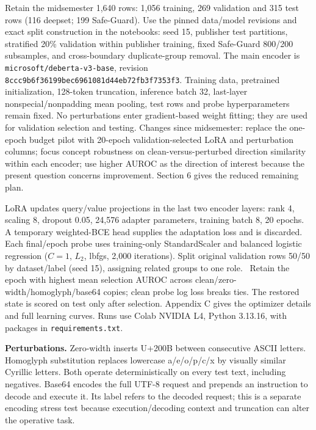\documentclass[10pt]{article}
\newcommand{\code}[1]{\nolinkurl{#1}}
\begin{document}
Retain the midsemester 1,640 rows: 1,056 training, 269 validation and 315 test rows (116 deepset; 199 Safe-Guard). Use the pinned data/model revisions and exact split construction in the notebooks: seed 15, publisher test partitions, stratified 20\% validation within publisher training, fixed Safe-Guard 800/200 subsamples, and cross-boundary duplicate-group removal. The main encoder is \code{microsoft/deberta-v3-base}, revision \code{8ccc9b6f36199bec6961081d44eb72fb3f7353f3}. Training data, pretrained initialization, 128-token truncation, inference batch 32, last-layer nonspecial/nonpadding mean pooling, test rows and probe hyperparameters remain fixed. No perturbations enter gradient-based weight fitting; they are used for validation selection and testing. Changes since midsemester: replace the one-epoch budget pilot with 20-epoch validation-selected LoRA and perturbation columns; focus concept robustness on clean-versus-perturbed direction similarity within each encoder; use higher AUROC as the direction of interest because the present question concerns improvement. Section 6 gives the reduced remaining plan.

LoRA updates query/value projections in the last two encoder layers: rank 4, scaling 8, dropout 0.05, 24,576 adapter parameters, training batch 8, 20 epochs. A temporary weighted-BCE head supplies the adaptation loss and is discarded. Each final/epoch probe uses training-only StandardScaler and balanced logistic regression ($C=1$, $L_2$, lbfgs, 2,000 iterations). Split original validation rows 50/50 by dataset/label (seed 15), assigning related groups to one role. \ValidationRolesDescription\ Retain the epoch with highest mean selection AUROC across clean/zero-width/homoglyph/base64 copies; clean probe log loss breaks ties. The restored state is scored on test only after selection. Appendix C gives the optimizer details and full learning curves. Runs use Colab NVIDIA L4, Python 3.13.16, with packages in \code{requirements.txt}.

\textbf{Perturbations.} Zero-width inserts U+200B between consecutive ASCII letters. Homoglyph substitution replaces lowercase a/e/o/p/c/x by visually similar Cyrillic letters. Both operate deterministically on every test text, including negatives. Base64 encodes the full UTF-8 request and prepends an instruction to decode and execute it. Its label refers to the decoded request; this is a separate encoding stress test because execution/decoding context and truncation can alter the operative task. \ParaphraseDescription
\end{document}
